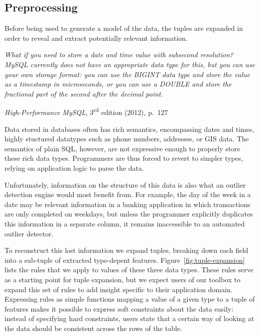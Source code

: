 \subsection{Preprocessing}
\label{sec:preprocessing}

Before being used to generate a model of the data, the tuples are expanded in order to reveal and extract potentially relevant information.

\vspace{0.1in}

\noindent
\begin{minipage}{\linewidth}
  \begin{minipage}{0.8\linewidth}
    \itshape
    What if you need to store a date and time value with subsecond resolution? MySQL
    currently does not have an appropriate data type for this, but you can use your own
    storage format: you can use the BIGINT data type and store the value as a timestamp in
    microseconds, or you can use a DOUBLE and store the fractional part of the second after
    the decimal point.
  \end{minipage}
  \begin{flushright}
    \textit{High-Performance MySQL}, 3\textsuperscript{rd} edition (2012), p.~127
  \end{flushright}
\end{minipage}\vspace{\figurepadding}

Data stored in databases often has rich semantics, encompassing dates and times, highly stuctured datatypes such as phone numbers, addresses, or GIS data. The semantics of plain SQL, however, are not expressive enough to properly store these rich data types. Programmers are thus forced to revert to simpler types, relying on application logic to parse the data.

Unfortunately, information on the structure of this data is also what an outlier detection engine would most benefit from. For example, the day of the week in a date may be relevant information in a banking application in which transactions are only completed on weekdays, but unless the programmer explicitly duplicates this information in a separate column, it remains inaccessible to an automated outlier detector.

To reconstruct this lost information we expand tuples, breaking down each field into a sub-tuple of extracted type-depent features. Figure~\ref{fig:tuple-expansion} lists the rules that we apply to values of these three data types. These rules serve as a starting point for tuple expansion, but we expect users of our toolbox to expand this set of rules to add insight specific to their application domain. Expressing rules as simple functions mapping a value of a given type to a tuple of features makes it possible to express soft constraints about the data easily: instead of specifying hard constraints, users state that a certain way of looking at the data should be consistent across the rows of the table.

